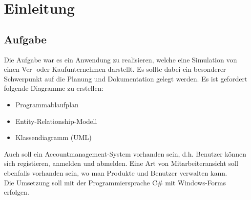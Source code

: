\chapter*{Einleitung}
\section*{Aufgabe}
Die Aufgabe war es ein Anwendung zu realisieren, welche eine Simulation von einen Ver- oder Kaufunternehmen darstellt. Es sollte dabei ein besonderer Schwerpunkt auf die Planung und Dokumentation gelegt werden. Es ist gefordert folgende Diagramme zu erstellen:
\begin{itemize}
\item Programmablaufplan
\item Entity-Relationship-Modell
\item Klassendiagramm (UML)
\end{itemize}
Auch soll ein Accountmanagement-System vorhanden sein, d.h. Benutzer können sich registieren, anmelden und abmelden. Eine Art von Mitarbeiteransicht soll ebenfalls vorhanden sein, wo man Produkte und Benutzer verwalten kann.\\
Die Umsetzung soll mit der Programmiersprache C\# mit Windows-Forms erfolgen.